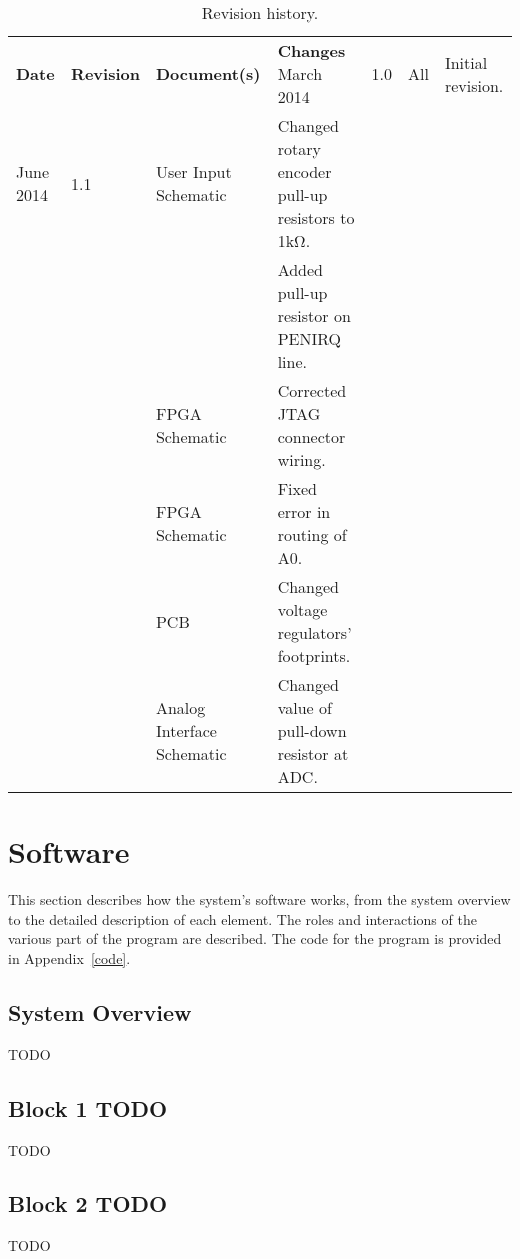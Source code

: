 \documentclass{scrartcl}
\begin{document}
	\begin{table}
	  \centering
    		\begin{tabular}{|p{3cm} p{3cm} p{3cm} p{10cm} |}
		 \hline
		 \textbf{Date} & \textbf{Revision} & \textbf{Document(s)} & \textbf{Changes} 
		 \hline
		 March 2014 & 1.0 & All & Initial revision. \\
		 June 2014 & 1.1 & User Input Schematic & Changed rotary encoder pull-up resistors to 1kΩ.\\
		                   &       &                                    & Added pull-up resistor on PENIRQ line.\\
		                   &       & FPGA Schematic        & Corrected JTAG connector wiring.\\
		                   &       & FPGA Schematic        & Fixed error in routing of A0.\\
                                     &       & PCB           		     & Changed voltage regulators' footprints.\\
		                   &       & Analog Interface Schematic        & Changed value of pull-down resistor at ADC.\\
		\hline
		\end{tabular}
	     \label{tab:rev_history}
              \caption{Revision history.}
	\end{table}


	\section{Software}
	This section describes how the system's software works, from the system overview to the detailed description of each element. The roles and interactions of the various part of the program are described. The code for the program is provided in Appendix~\ref{code}.
	
	\subsection{System Overview}
	TODO

	\subsection{Block 1 TODO}
	TODO

	\subsection{Block 2 TODO}
	TODO
\end{document}
